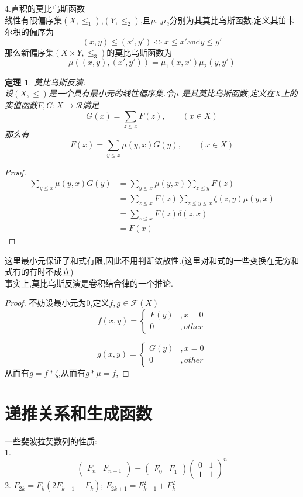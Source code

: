 \documentclass[12pt, a4paper, oneside]{ctexbook}
\newtheorem{theorem}{定理}[section]
\newcommand{\newp}[1]{\vspace{#1\baselineskip}\noindent}
\begin{document}
4.直积的莫比乌斯函数\\
线性有限偏序集$(X,\le_1)$,$(Y,\le_2)$,且$\mu_1$,$\mu_2$分别为其莫比乌斯函数,定义其笛卡尔积的偏序为
$$
(x,y)\le (x',y') \iff x\le x' \text{and} y \le y'
$$
那么新偏序集$(X\times Y ,\le_3 )$的莫比乌斯函数为
$$
\mu((x,y),(x',y'))=\mu_1(x,x')\mu_2(y,y')
$$


\begin{theorem}
  莫比乌斯反演:\\
设$(X,\le)$是一个具有最小元的线性偏序集.令$\mu$ 是其莫比乌斯函数,定义在$X$上的实值函数$F,G:X\rightarrow \mathcal{R}$满足
$$
G(x)=\sum_{z\le x} F(z),\qquad (x\in X)
$$
那么有
$$
F(x)=\sum_{y\le x} \mu(y,x) G(y),\qquad (x\in X)
$$
\end{theorem}

\begin{proof}
  $$
  \begin{aligned}
  \sum_{y \le x} \mu(y,x) G(y) &=\sum_{y \le x} \mu(y,x) \sum_{z\le y} F(z)\\
  &=\sum_{z \le x}F(z) \sum_{ z\le y \le x} \zeta(z,y)\mu(y,x)\\
  &=\sum_{z\le x} F(z) \delta(z,x)\\
  &=F(x)
  \end{aligned}
  $$
\end{proof}
这里最小元保证了和式有限,因此不用判断敛散性.(这里对和式的一些变换在无穷和式有的有时不成立)\\ 
事实上,莫比乌斯反演是卷积结合律的一个推论.\\
\begin{proof}
  不妨设最小元为0,定义$f,g\in \mathcal{F}(X)$
  $$
  f(x,y)=\begin{cases}
  F(y)&, x=0\\
  0&,other
  \end{cases}
  $$

  $$
  g(x,y)=\begin{cases}
  G(y)&, x=0\\
  0&,other
  \end{cases}
  $$
  从而有$g=f*\zeta$,从而有$g*\mu=f$,

\end{proof}


\newp{3}
\section{递推关系和生成函数}
一些斐波拉契数列的性质:\\
1.
$$
\begin{pmatrix}
  F_n &F_{n+1}
\end{pmatrix}=
\begin{pmatrix}
  F_0 &F_1
\end{pmatrix}
\begin{pmatrix}
  0 &1\\1&1
\end{pmatrix}^n
$$
2.
$F_{2k}=F_k(2F_{k+1}-F_k)$; 
$F_{2k+1}=F_{k+1}^2+F_{k}^2$
\end{document}
